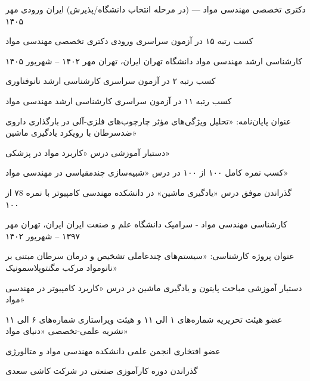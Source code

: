 

\begin{cventries}
	
	\cventry
	{دکتری تخصصی مهندسی مواد} %
	{--- (در مرحله انتخاب دانشگاه/پذیرش)} %
	{ایران} %
	{ورودی مهر ۱۴۰۵} %
	{
		\begin{cvitems} %
			\item {کسب رتبه ۱۵ در آزمون سراسری ورودی دکتری تخصصی مهندسی مواد}
		\end{cvitems}
	}
	
	\cventry
	{کارشناسی ارشد مهندسی مواد} %
	{دانشگاه تهران} %
	{ایران، تهران} %
	{مهر ۱۴۰۲ – شهریور ۱۴۰۵} %
	{
		\begin{cvitems} %
			\item {کسب رتبه ۲ در آزمون سراسری کارشناسی ارشد نانوفناوری}
			\item {کسب رتبه ۱۱ در آزمون سراسری کارشناسی ارشد مهندسی مواد}
			\item {عنوان پایان‌نامه: «تحلیل ویژگی‌های مؤثر چارچوب‌های فلزی-آلی  در بارگذاری داروی ضدسرطان با رویکرد یادگیری ماشین»}
			\item {دستیار آموزشی  درس «کاربرد مواد در پزشکی»}
			\item {کسب نمره کامل 
				\lr{)}۱۰۰ از ۱۰۰\lr{(} 
				در درس «شبیه‌سازی چندمقیاسی در مهندسی مواد»}
			\item {گذراندن موفق درس «یادگیری ماشین» در دانشکده مهندسی کامپیوتر با نمره ۷8 از ۱۰۰}
		\end{cvitems}
	}
	
	\cventry
	{کارشناسی مهندسی مواد - سرامیک} %
	{دانشگاه علم و صنعت ایران} %
	{ایران، تهران} %
	{مهر ۱۳۹۷ – شهریور ۱۴۰۲} %
	{
		\begin{cvitems} %
			\item {عنوان پروژه کارشناسی: «سیستم‌های چندعاملی تشخیص و درمان سرطان مبتنی بر نانومواد مرکب مگنتوپلاسمونیک»}
			\item {دستیار آموزشی  مباحث پایتون و یادگیری ماشین در درس «کاربرد کامپیوتر در مهندسی مواد»}
			\item {عضو هیئت تحریریه 
				\lr{)}شماره‌های ۱ الی ۱۱\lr{(} 
				و هیئت ویراستاری
				\lr{)}شماره‌های ۶ الی ۱۱\lr{(}
				  نشریه علمی-تخصصی «دنیای مواد»}
			\item {عضو افتخاری انجمن علمی دانشکده مهندسی مواد و متالورژی}
			\item {گذراندن دوره کارآموزی صنعتی در شرکت کاشی سعدی}
		\end{cvitems}
	}
	




\end{cventries}
